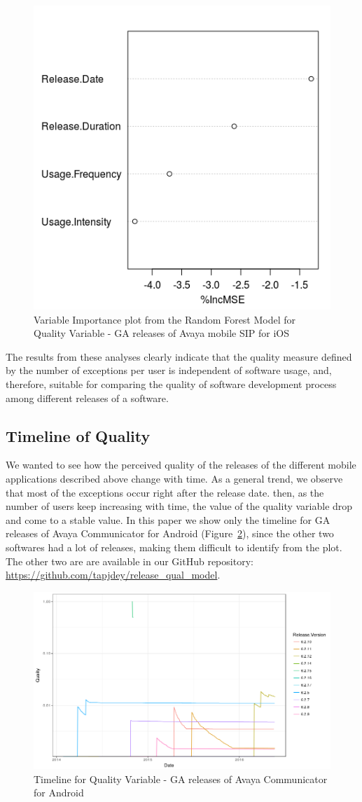 \documentclass[smallextended]{svjour3}       %
\begin{document}
\begin{figure}[!t]
\centering
\includegraphics[width=0.4\linewidth]{rfqI}
\caption{Variable Importance plot from the Random Forest  Model for Quality Variable - GA releases of Avaya mobile SIP for iOS}
\label{fig:rf2I}
\vspace{-15pt}
\end{figure}

The results from these analyses clearly indicate that the quality measure defined by the number of exceptions per user is independent of software usage, and, therefore, suitable for comparing the quality of software development process among different releases of a software.

\subsection{Timeline of Quality}
We wanted to see how the perceived quality of the releases of the different mobile applications described above change with time. As a general trend, we observe that most of the exceptions occur right after the release date. then, as the number of users keep increasing with time, the value of the quality variable drop and come to a stable value.  In this paper we show only the timeline for GA releases of Avaya Communicator for Android (Figure~\ref{fig:tI}), since the other two softwares had a lot of releases, making them difficult to identify from the plot. The other two are  are available in our GitHub repository:\\ \url{https://github.com/tapjdey/release\_qual\_model}.

\begin{figure}[!t]
\centering
\includegraphics[width=\linewidth]{timeline_I}
\caption{Timeline for Quality Variable - GA releases of Avaya Communicator for Android}
\label{fig:tI}
\vspace{-10pt}
\end{figure}
\end{document}
